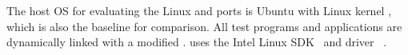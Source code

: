 The host OS for evaluating the Linux and \sgx{} ports is Ubuntu \ubuntuversion{} with Linux kernel \linuxversion{},
which is also the baseline for comparison.
All test programs and applications are dynamically linked
with a modified \glibc{} \glibcversion{}.
\graphenesgx{}
uses the Intel \sgx{} Linux SDK~\cite{intel-sgx-linux-sdk} and driver~\cite{intel-sgx-linux-driver} \sgxdriverversion{}.










